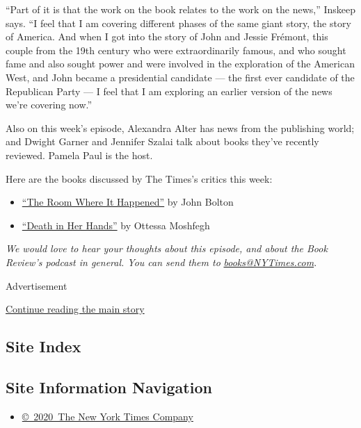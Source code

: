 ``Part of it is that the work on the book relates to the work on the
news,'' Inskeep says. ``I feel that I am covering different phases of
the same giant story, the story of America. And when I got into the
story of John and Jessie Frémont, this couple from the 19th century who
were extraordinarily famous, and who sought fame and also sought power
and were involved in the exploration of the American West, and John
became a presidential candidate --- the first ever candidate of the
Republican Party --- I feel that I am exploring an earlier version of
the news we're covering now.''

Also on this week's episode, Alexandra Alter has news from the
publishing world; and Dwight Garner and Jennifer Szalai talk about books
they've recently reviewed. Pamela Paul is the host.

Here are the books discussed by The Times's critics this week:

\begin{itemize}
\item
  \href{https://www.nytimes3xbfgragh.onion/2020/06/17/books/review-room-where-it-happened-john-bolton-memoir.html}{``The
  Room Where It Happened''} by John Bolton
\item
  \href{https://www.nytimes3xbfgragh.onion/2020/06/19/books/review-death-in-her-hands-ottessa-moshfegh.html}{``Death
  in Her Hands''} by Ottessa Moshfegh
\end{itemize}

\emph{We would love to hear your thoughts about this episode, and about
the Book Review's podcast in general. You can send them to}
\href{mailto:books@NYTimes.com}{\emph{books@NYTimes.com}}\emph{.}

Advertisement

\protect\hyperlink{after-bottom}{Continue reading the main story}

\hypertarget{site-index}{%
\subsection{Site Index}\label{site-index}}

\hypertarget{site-information-navigation}{%
\subsection{Site Information
Navigation}\label{site-information-navigation}}

\begin{itemize}
\tightlist
\item
  \href{https://help.nytimes3xbfgragh.onion/hc/en-us/articles/115014792127-Copyright-notice}{©~2020~The
  New York Times Company}
\end{itemize}

